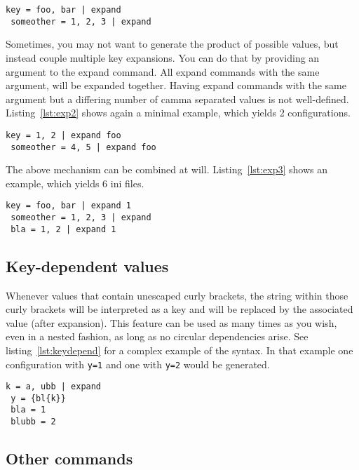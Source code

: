 \documentclass[11pt]{article}
\begin{document}
\begin{lstlisting}[caption={A simple example of expanded keys},label=lst:exp1]
 key = foo, bar | expand
 someother = 1, 2, 3 | expand
\end{lstlisting}

Sometimes, you may not want to generate the product of possible values, but instead couple multiple key expansions. You can do that by providing an argument to the expand command. All expand commands with the same argument, will be expanded together. Having expand commands with the same argument but a differing number of camma separated values is not well-defined. Listing~\ref{lst:exp2} shows again a minimal example, which yields 2 configurations.

\begin{lstlisting}[caption={A simple example of expanded keys with argument},label=lst:exp2]
 key = 1, 2 | expand foo
 someother = 4, 5 | expand foo
\end{lstlisting}

The above mechanism can be combined at will. Listing~\ref{lst:exp3} shows an example, which yields 6 ini files.

\begin{lstlisting}[caption={A simple combining multiple expansions},label=lst:exp3]
 key = foo, bar | expand 1
 someother = 1, 2, 3 | expand
 bla = 1, 2 | expand 1
\end{lstlisting}

\subsection{Key-dependent values}
\label{sec:keydepend}

Whenever values that contain unescaped curly brackets, the string within those curly brackets will be interpreted as a key and will be replaced by the associated value (after expansion). This feature can be used as many times as you wish, even in a nested fashion, as long as no circular dependencies arise. See listing~\ref{lst:keydepend} for a complex example of the syntax. In that example one configuration with \lstinline!y=1! and one with \lstinline!y=2! would be generated.

\begin{lstlisting}[caption={A complex example of key-dependent value syntax},label=lst:keydepend]
 k = a, ubb | expand
 y = {bl{k}}
 bla = 1
 blubb = 2
\end{lstlisting}

\subsection{Other commands}
\end{document}
